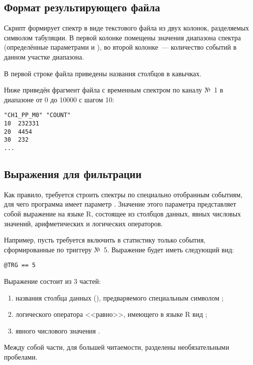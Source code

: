 \subsection{Формат результирующего файла}

Скрипт формирует спектр в виде текстового файла из двух колонок, разделяемых символом табуляции. В первой колонке помещены значения диапазона спектра (определённые параметрами  и ), во второй колонке~--- количество событий в данном участке диапазона.

В первой строке файла приведены названия столбцов в кавычках.

Ниже приведён фрагмент файла с временным спектром по каналу №~1 в диапазоне от 0 до 10000 с шагом 10:

\begin{lstlisting}
"CH1_PP_M0"	"COUNT"
10	232331
20	4454
30	232
...
\end{lstlisting}

\subsection{Выражения для фильтрации}
\label{sec-peaks-distr-1d-filter}

Как правило, требуется строить спектры по специально отобранным событиям, для чего программа имеет параметр . Значение этого параметра представляет собой выражение на языке R, состоящее из столбцов данных, явных числовых значений, арифметических и логических операторов.

Например, пусть требуется включить в статистику только события, сформированные по триггеру №~5. Выражение будет иметь следующий вид:

\begin{lstlisting}
@TRG == 5
\end{lstlisting}

Выражение состоит из 3 частей:

\begin{enumerate}
\item названия столбца данных (), предваряемого специальным символом ;
\item логического оператора <<равно>>, имеющего в языке R вид \CMDARG{==};
\item явного числового значения .
\end{enumerate}

Между собой части, для большей читаемости, разделены необязательными пробелами.

